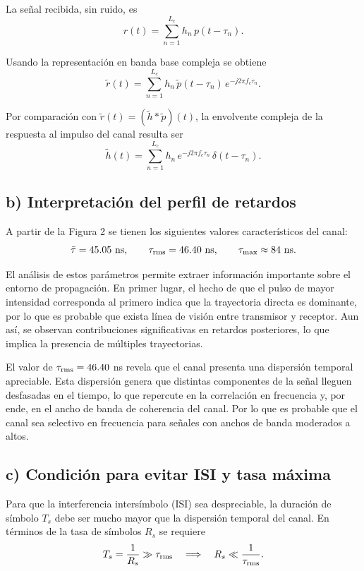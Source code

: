 \documentclass[11pt]{article}
\begin{document}
La señal recibida, sin ruido, es
\[
r(t) = \sum_{n=1}^{L_c} h_n\,p(t-\tau_n).
\]

Usando la representación en banda base compleja se obtiene
\[
\tilde r(t) = \sum_{n=1}^{L_c} h_n\,\tilde p(t-\tau_n)\,e^{-j2\pi f_c \tau_n}.
\]

Por comparación con $\tilde r(t) = (\tilde h * \tilde p)(t)$, la envolvente compleja de la respuesta al impulso del canal resulta ser
\[
\tilde h(t) = \sum_{n=1}^{L_c} h_n \, e^{-j2\pi f_c \tau_n}\,\delta(t-\tau_n).
\]


\subsection*{b) Interpretación del perfil de retardos}

A partir de la Figura 2 se tienen los siguientes valores característicos del canal: 
\[
\bar\tau = 45.05\ \text{ns}, \qquad 
\tau_{\rm rms} = 46.40\ \text{ns}, \qquad 
\tau_{\max} \approx 84\ \text{ns}.
\]

El análisis de estos parámetros permite extraer información importante sobre el entorno de propagación. En primer lugar, el hecho de que el pulso de mayor intensidad corresponda al primero indica que la trayectoria directa es dominante, por lo que es probable que exista línea de visión entre transmisor y receptor. Aun así, se observan contribuciones significativas en retardos posteriores, lo que implica la presencia de múltiples trayectorias.

El valor de $\tau_{\rm rms} = 46.40$ ns revela que el canal presenta una dispersión temporal apreciable. Esta dispersión genera que distintas componentes de la señal lleguen desfasadas en el tiempo, lo que repercute en la correlación en frecuencia y, por ende, en el ancho de banda de coherencia del canal. Por lo que es probable que el canal sea selectivo en frecuencia para señales con anchos de banda moderados a altos.

\subsection*{c) Condición para evitar ISI y tasa máxima}

Para que la interferencia intersímbolo (ISI) sea despreciable, la duración de símbolo $T_s$ debe ser mucho mayor que la dispersión temporal del canal. En términos de la tasa de símbolos $R_s$ se requiere
\[
T_s = \frac{1}{R_s} \gg \tau_{\rm rms}
\quad \Longrightarrow \quad
R_s \ll \frac{1}{\tau_{\rm rms}}.
\]
\end{document}
